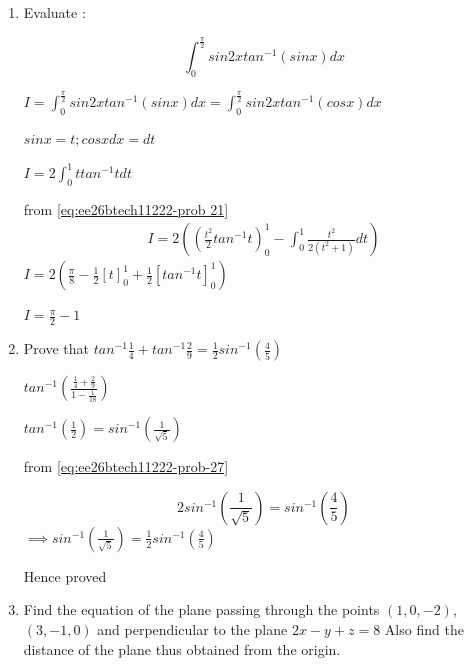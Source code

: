\begin{enumerate}[label=\thesubsection.\arabic*, ref=\thesubsection.\theenumi]
Solve the following differential equation \newline $(1+e^{y/x})dy+e^{y/x}(1-\frac{y}{x})dx=0(x\ne0).$

\solution

Let $\frac{y}{x} =t \implies \frac{dy}{dx} =t + x\frac{dt}{dx} $

$$(1+e^t)(t+x\frac{dt}{dx})+ e^t(1-t) =0$$  $$\frac{e^t +t}{e^t+1}dt=-\frac{1}{x}dx$$

$$ln(e^t + t)=ln(\frac{1}{x}) \implies e^t + t= \frac{1}{x} $$

$$e^{\frac{y}{x}} + \frac{y}{x} = \frac{1}{x}$$

\item 

Evaluate : 

$$ \int_0^\frac{\pi}{2}sin2xtan^{-1}(sinx)dx$$

\solution

$I=\int_0^\frac{\pi}{2} sin2xtan^{-1}(sinx)dx=\int_0^\frac{\pi}{2}sin2xtan^{-1}(cosx)dx$

$sinx=t; cosxdx=dt$


$I=2\int_0^1ttan^{-1}tdt$  

from \eqref{eq:ee26btech11222-prob 21}
\begin{align}
	I= 2\left(\left(\frac{t^2}{2}tan^{-1}t\right)_0^1-\int _0^1 \frac{t^2}{2(t^2+1)}dt\right)
\end{align}
 $I=2\left(\frac{\pi}{8}-\frac{1}{2}\left[t\right]_0^1 +\frac{1}{2}\left[tan^{-1}t\right]_0^1\right) $

$I =\frac{\pi}{2}-1$

\item 

Prove that $tan^{-1}\frac{1}{4}+tan^{-1}\frac{2}{9}=\frac{1}{2}sin^{-1}(\frac{4}{5})$

\solution


$tan^{-1}\left(\frac{\frac{1}{4} +\frac{2}{9}}{1-\frac{1}{18}}\right)$

$tan^{-1}(\frac{1}{2})=sin^{-1}(\frac{1}{\sqrt{5}})$

from \eqref{eq:ee26btech11222-prob-27}

$$2sin^{-1}(\frac{1}{\sqrt{5}})= sin^{-1}(\frac{4}{5})$$ $\implies sin^{-1}(\frac{1}{\sqrt{5}})=\frac{1}{2}sin^{-1}(\frac{4}{5})$

Hence proved 

\item 

Find the equation of the plane passing through the points $(1,0,-2)$, $(3,-1,0)$ and perpendicular to the plane $2x-y+z=8$ Also find the distance of the plane thus obtained from the origin.  


\end{enumerate}
